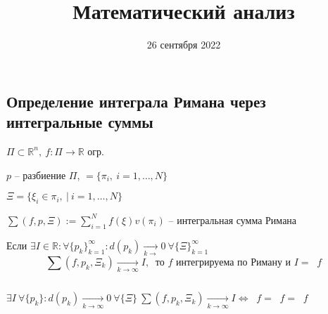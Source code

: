 

\DeclareMathOperator{\Kerr}{Ker}
\DeclareMathOperator{\Imm}{Im}
\DeclareMathOperator{\Int}{Int}
\DeclareMathOperator{\Mat}{Mat}
\DeclareMathOperator{\rank}{rank}
\DeclareMathOperator{\diam}{diam}
\DeclareMathOperator*{\id}{id}
\renewcommand{\phi}{\varphi}
\renewcommand{\theta}{\vartheta}
\renewcommand{\epsilon}{\varepsilon}
\newcommand{\R}{\mathbb{R}}
\renewcommand{\C}{\mathbb{C}}
\newcommand{\Q}{\mathbb{Q}}
\newcommand{\N}{\mathbb{N}}
\setcounter{lemma}{3}
\DeclareMathOperator{\lrhimani}{\underset{\Pi}{\underline{\int}}}
\DeclareMathOperator{\urhimani}{\underset{\Pi}{\overline{\int}}}
\DeclareMathOperator{\rhimani}{\underset{\Pi}{\int}}



    \title{Математический анализ}
    \date{26 сентября 2022}
    \maketitle

    \pagebreak

    \subsection*{Определение интеграла Римана через интегральные суммы}

    $\Pi \subset \R^n, \ f : \Pi \rightarrow \R$ огр.
    \par $p$ -- разбиение $\Pi$, $= \{\pi_i, \ i = 1, \dots, N\}$
    \par $\Xi = \{\xi_i \in \pi_i, \ | \ i = 1, \dots, N\}$
    \par $\sum(f, p, \Xi) := \sum_{i=1}^N f(\xi) v(\pi_i)$ -- интегральная сумма Римана

    \begin{definition}
        Если $\exists I \in \R : \forall \{p_k\}_{k=1}^\infty : d(p_k) \xrightarrow[k \rightarrow]{} 0 \ \forall \{\Xi\}_{k=1}^\infty$
        \[
            \sum(f, p_k, \Xi_k) \xrightarrow[k \rightarrow \infty]{} I, \ \text{ то } f \text{ интегрируема по Риману и } I = \rhimani f    
        \]
    \end{definition}

    \begin{theorem}
        $ $
        \par $\exists I \ \forall \{p_k\} : d(p_k) \xrightarrow[k \rightarrow \infty]{} 0 \ \forall \{\Xi\} \ \sum(f, p_k, \Xi_k) \xrightarrow[k \rightarrow \infty]{} I \Leftrightarrow \lrhimani f = \urhimani f = \rhimani f$
    \end{theorem}
    

